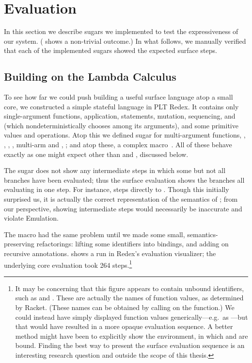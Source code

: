\section{Evaluation}
\label{sec:reval-examples}

In this section we describe sugars we implemented to test the
expressiveness of our system. 
( shows a non-trivial outcome.)
In what follows, we manually
verified that each of the implemented sugars showed the expected
surface steps.

\subsection{Building on the Lambda Calculus}

To see how far we could push building a useful surface language atop a
small core, we constructed a
simple stateful language in PLT Redex.  It contains only
single-argument functions, application,  statements,
mutation, sequencing, and  (which nondeterministically
chooses among its arguments), and some primitive values and operations.
Atop this we defined sugar for
multi-argument functions, , , ,
, multi-arm  and , ;
and atop these, a complex  macro~\cite{sk:automata-macros}.
All of
these behave exactly as one might expect other than  and
, discussed below.

The  sugar does not show any intermediate steps in which
some but not all branches have been evaluated; thus the surface
evaluation shows the branches all evaluating in one step. For instance,
 steps directly to
. Though this initially
surprised us, it is actually the correct representation of the
semantics of ; from our perspective,
showing intermediate steps would necessarily be
inaccurate and violate Emulation.

The  macro had the same problem until we made some
small, semantics-preserving refactorings: lifting some identifiers
into  bindings, and adding \Code{!} on recursive
annotations.  shows a run in Redex's evaluation
visualizer; the underlying core evaluation took 264 steps.\footnote{%
It may be concerning that this figure appears to contain unbound
identifiers, such as  and . These are actually the
names of function values, as determined by Racket. (These names can be
obtained by calling  on the function.) We could
instead have simply displayed function values generically---e.g.\ as
---but that would have resulted in a more opaque
evaluation sequence. A better method might have been to explicitly
show the environment, in which  and  are bound.
Finding the best way to present the surface evaluation sequence is an
interesting research question and outside the scope of this thesis.}


